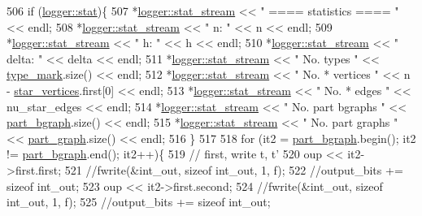 \begin{DoxyCode}
506   \textcolor{keywordflow}{if} (\hyperlink{classlogger_a26812b5ba03f130e8dae3446d5fc032f}{logger::stat})\{
507     *\hyperlink{classlogger_a7db37821f875f2ba3540980b355779f5}{logger::stat\_stream} << \textcolor{stringliteral}{" ==== statistics ==== "} << endl;
508     *\hyperlink{classlogger_a7db37821f875f2ba3540980b355779f5}{logger::stat\_stream} << \textcolor{stringliteral}{" n:                "} << n << endl;
509     *\hyperlink{classlogger_a7db37821f875f2ba3540980b355779f5}{logger::stat\_stream} << \textcolor{stringliteral}{" h:                "} << h << endl;
510     *\hyperlink{classlogger_a7db37821f875f2ba3540980b355779f5}{logger::stat\_stream} << \textcolor{stringliteral}{" delta:            "} << delta << endl;
511     *\hyperlink{classlogger_a7db37821f875f2ba3540980b355779f5}{logger::stat\_stream} << \textcolor{stringliteral}{" No. types         "} << 
      \hyperlink{classmarked__graph__compressed_a86b00223525703e973415cbc9c94da68}{type\_mark}.size() << endl;
512     *\hyperlink{classlogger_a7db37821f875f2ba3540980b355779f5}{logger::stat\_stream} << \textcolor{stringliteral}{" No. * vertices    "} << n - 
      \hyperlink{classmarked__graph__compressed_a7a4ced4586e2e353f9076bd447df5208}{star\_vertices}.first[0] << endl;
513     *\hyperlink{classlogger_a7db37821f875f2ba3540980b355779f5}{logger::stat\_stream} << \textcolor{stringliteral}{" No. * edges       "} << nu\_star\_edges << endl;
514     *\hyperlink{classlogger_a7db37821f875f2ba3540980b355779f5}{logger::stat\_stream} << \textcolor{stringliteral}{" No. part bgraphs  "} << 
      \hyperlink{classmarked__graph__compressed_a7b3267063fba30b45eb21b3ba4e07536}{part\_bgraph}.size() << endl;
515     *\hyperlink{classlogger_a7db37821f875f2ba3540980b355779f5}{logger::stat\_stream} << \textcolor{stringliteral}{" No. part graphs   "} << 
      \hyperlink{classmarked__graph__compressed_ae179a4737e6eab905c18a94d44ef64b7}{part\_graph}.size() << endl;
516   \}
517 
518   \textcolor{keywordflow}{for} (it2 = \hyperlink{classmarked__graph__compressed_a7b3267063fba30b45eb21b3ba4e07536}{part\_bgraph}.begin(); it2 != \hyperlink{classmarked__graph__compressed_a7b3267063fba30b45eb21b3ba4e07536}{part\_bgraph}.end(); it2++)\{
519     \textcolor{comment}{// first, write t, t'}
520     oup << it2->first.first;
521     \textcolor{comment}{//fwrite(&int\_out, sizeof int\_out, 1, f);}
522     \textcolor{comment}{//output\_bits += sizeof int\_out;}
523     oup <<  it2->first.second;
524     \textcolor{comment}{//fwrite(&int\_out, sizeof int\_out, 1, f);}
525     \textcolor{comment}{//output\_bits += sizeof int\_out;}

\end{DoxyCode}
